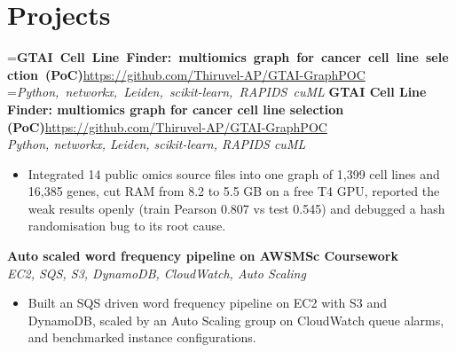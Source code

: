 \documentclass[a4paper,11pt]{article}
\newcommand{\project}[3]{%
  \textbf{#1}\hfill#3\\ {\color{muted}\small\textit{#2}}\par}
\newcommand{\badge}[1]{{\color{navy}\small\textbf{#1}}}
\newcommand{\gap}{\vspace{5pt}}
\begin{document}
\section{Projects}
=\hbox{\textbf{GTAI Cell Line Finder: multiomics graph for cancer cell line selection (PoC)}\hspace{1em}\url{https://github.com/Thiruvel-AP/GTAI-GraphPOC}}%
=\hbox{{\small\textit{Python, networkx, Leiden, scikit-learn, RAPIDS cuML}}}%
\ifdim\wd0>\linewidth
\ifdim\wd2>\linewidth
\textbf{GTAI Cell Line Finder: multiomics graph for cancer cell line selection (PoC)}\\ {\color{muted}\small\textit{Python, networkx, Leiden, scikit-learn, RAPIDS cuML}}\\ \hfill{\small\url{https://github.com/Thiruvel-AP/GTAI-GraphPOC}}\par
\else
\textbf{GTAI Cell Line Finder: multiomics graph for cancer cell line selection (PoC)}\\ {\color{muted}\small\textit{Python, networkx, Leiden, scikit-learn, RAPIDS cuML}}\hfill{\small\url{https://github.com/Thiruvel-AP/GTAI-GraphPOC}}\par
\fi
\else
\project{GTAI Cell Line Finder: multiomics graph for cancer cell line selection (PoC)}{Python, networkx, Leiden, scikit-learn, RAPIDS cuML}{\url{https://github.com/Thiruvel-AP/GTAI-GraphPOC}}
\fi
\begin{itemize}
  \item Integrated 14 public omics source files into one graph of 1,399 cell lines and 16,385 genes, cut RAM from 8.2 to 5.5 GB on a free T4 GPU, reported the weak results openly (train Pearson 0.807 vs test 0.545) and debugged a hash randomisation bug to its root cause.
\end{itemize}
\gap
{}
\project{Auto scaled word frequency pipeline on AWS}{EC2, SQS, S3, DynamoDB, CloudWatch, Auto Scaling}{\badge{MSc Coursework}}
\begin{itemize}
  \item Built an SQS driven word frequency pipeline on EC2 with S3 and DynamoDB, scaled by an Auto Scaling group on CloudWatch queue alarms, and benchmarked instance configurations.
\end{itemize}
\end{document}
